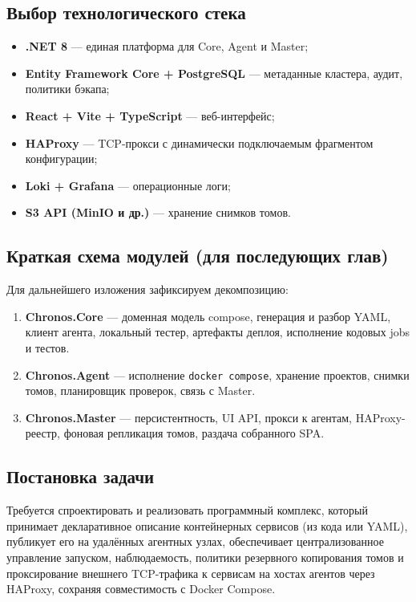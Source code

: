 \subsection{Выбор технологического стека}

\begin{itemize}[leftmargin=1.5cm]
  \item \textbf{.NET 8} --- единая платформа для Core, Agent и Master;
  \item \textbf{Entity Framework Core + PostgreSQL} --- метаданные кластера, аудит, политики бэкапа;
  \item \textbf{React + Vite + TypeScript} --- веб-интерфейс;
  \item \textbf{HAProxy} --- TCP-прокси с динамически подключаемым фрагментом конфигурации;
  \item \textbf{Loki + Grafana} --- операционные логи;
  \item \textbf{S3 API (MinIO и др.)} --- хранение снимков томов.
\end{itemize}

\subsection{Краткая схема модулей (для последующих глав)}

Для дальнейшего изложения зафиксируем декомпозицию:
\begin{enumerate}[leftmargin=1.5cm]
  \item \textbf{Chronos.Core} --- доменная модель compose, генерация и разбор YAML, клиент агента, локальный тестер, артефакты деплоя, исполнение кодовых jobs и тестов.
  \item \textbf{Chronos.Agent} --- исполнение \texttt{docker compose}, хранение проектов, снимки томов, планировщик проверок, связь с Master.
  \item \textbf{Chronos.Master} --- персистентность, UI API, прокси к агентам, HAProxy-реестр, фоновая репликация томов, раздача собранного SPA.
\end{enumerate}

\subsection{Постановка задачи}

Требуется спроектировать и реализовать программный комплекс, который принимает декларативное описание контейнерных сервисов (из кода или YAML), публикует его на удалённых агентных узлах, обеспечивает централизованное управление запуском, наблюдаемость, политики резервного копирования томов и проксирование внешнего TCP-трафика к сервисам на хостах агентов через HAProxy, сохраняя совместимость с Docker Compose.

